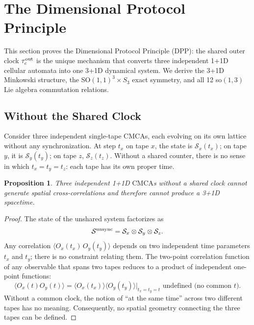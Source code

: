 \documentclass[11pt]{article}
\newtheorem{proposition}[theorem]{Proposition}
\theoremstyle{remark}
\newcommand{\CMCA}{\text{CMCA}}
\newcommand{\taucout}{\tau_c^{\rm out}}
\begin{document}
\FloatBarrier

\section{The Dimensional Protocol Principle}
\label{sec:dpp}

This section proves the Dimensional Protocol Principle (DPP): the shared
outer clock $\taucout$ is the unique mechanism that converts three
independent 1+1D cellular automata into one 3+1D dynamical system. We
derive the 3+1D Minkowski structure, the SO$(1,1)^3 \times S_3$ exact
symmetry, and all 12 so$(1,3)$ Lie algebra commutation relations.

\subsection{Without the Shared Clock}

Consider three independent single-tape $\CMCA$s, each evolving on its own
lattice without any synchronization. At step $t_x$ on tape $x$, the state
is $\mathcal{S}_x(t_x)$; on tape $y$, it is $\mathcal{S}_y(t_y)$; on tape
$z$, $\mathcal{S}_z(t_z)$. Without a shared counter, there is no sense in
which $t_x = t_y = t_z$: each tape has its own proper time.

\begin{proposition}
Three independent 1+1D $\CMCA$s without a shared clock cannot generate
spatial cross-correlations and therefore cannot produce a 3+1D spacetime.
\end{proposition}
\begin{proof}
The state of the unshared system factorizes as
\[
  \mathcal{S}^{\rm unsync} = \mathcal{S}_x \otimes \mathcal{S}_y
  \otimes \mathcal{S}_z.
\]
Any correlation $\langle O_x(t_x)\, O_y(t_y) \rangle$ depends on two
independent time parameters $t_x$ and $t_y$; there is no constraint
relating them. The two-point correlation function of any observable that
spans two tapes reduces to a product of independent one-point functions:
\[
  \langle O_x(t) O_y(t) \rangle
  = \langle O_x(t_x) \rangle \langle O_y(t_y) \rangle
  \Big|_{t_x = t_y = t}\text{ undefined (no common }t\text{)}.
\]
Without a common clock, the notion of ``at the same time'' across two
different tapes has no meaning. Consequently, no spatial geometry connecting
the three tapes can be defined.
\end{proof}
\end{document}

